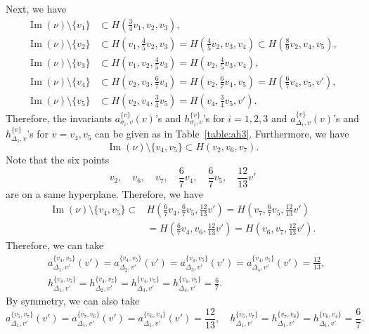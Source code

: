 Next, we have 
\begin{align*}
\operatorname{Im}(\nu) \setminus \{ v_1 \} &\subset H \left( \frac{3}{4} v_1, v_2, v_3 \right), \\
\operatorname{Im}(\nu) \setminus \{ v_2 \} &\subset H \left( v_1, \frac{4}{5} v_2, v_3 \right) = H \left( \frac{4}{5} v_2, v_3, v_4 \right) \subset H \left( \frac{8}{9} v_2, v_4, v_5 \right), \\
\operatorname{Im}(\nu) \setminus \{ v_3 \} &\subset H \left( v_1, v_2, \frac{4}{5} v_3 \right) = H \left( v_2, \frac{4}{5} v_3, v_4 \right), \\
\operatorname{Im}(\nu) \setminus \{ v_4 \} &\subset H \left( v_2, v_3, \frac{6}{7}v_4 \right) = H \left( v_2, \frac{6}{7}v_4, v_5 \right) = H \left(\frac{6}{7}v_4, v_5 ,v' \right), \\
\operatorname{Im}(\nu) \setminus \{ v_5 \} &\subset H \left( v_2, v_4, \frac{3}{4} v_5 \right) = H \left(v_4, \frac{3}{4} v_5, v' \right).
\end{align*}
Therefore, 
the invariants $a^{\{ v \}}_{\sigma _i, v}(v)$'s and $h^{\{ v \}}_{\sigma _i, v}$'s for $i=1,2,3$ 
and $a^{\{ v \}}_{\Delta _1, v}(v)$'s and $h^{\{ v \}}_{\Delta _1, v}$'s for $v = v_4, v_5$ can be given as in Table~\ref{table:ah3}. 
Furthermore, we have
\[
\operatorname{Im}(\nu) \setminus \{ v_4, v_5 \} \subset H(v_2, v_6, v_7). 
\]
Note that the six points
\[
v_2, \quad v_6, \quad v_7, \quad \frac{6}{7}v_4, \quad \frac{6}{7}v_5, \quad \frac{12}{13}v'
\]
are on a same hyperplane. 
Therefore, we have 
\begin{align*}
\operatorname{Im}(\nu) \setminus \{ v_4, v_5 \} 
\subset & H \left( \frac{6}{7}v_4, \frac{6}{7}v_5, \frac{12}{13}v' \right)
= H \left( v_7, \frac{6}{7}v_5, \frac{12}{13}v' \right) \\
&= H \left( \frac{6}{7}v_4, v_6, \frac{12}{13}v' \right)
= H \left( v_6, v_7, \frac{12}{13}v' \right). 
\end{align*}
Therefore, we can take 
\begin{align*}
&a^{\{ v_4, v_5 \}}_{\Delta _1, v'}(v') = a^{\{ v_4, v_5 \}}_{\Delta _2, v'}(v') = a^{\{ v_4, v_5 \}}_{\Delta _3, v'}(v') = a^{\{ v_4, v_5 \}}_{\Delta _4, v'}(v') = \frac{12}{13}, \\
&h^{\{ v_4, v_5 \}}_{\Delta _1, v'} = h^{\{ v_4, v_5 \}}_{\Delta _2, v'} = h^{\{ v_4, v_5 \}}_{\Delta _3, v'} = h^{\{ v_4, v_5 \}}_{\Delta _4, v'} = \frac{6}{7}. 
\end{align*}
By symmetry, we can also take
\[
a^{\{ v_5, v_7 \}}_{\Delta _1, v'}(v')
=a^{\{ v_7, v_6 \}}_{\Delta _1, v'}(v')
=a^{\{ v_6, v_4 \}}_{\Delta _1, v'}(v') = \frac{12}{13}, \quad
h^{\{ v_5, v_7 \}}_{\Delta _1, v'}
=h^{\{ v_7, v_6 \}}_{\Delta _1, v'}
=h^{\{ v_6, v_4 \}}_{\Delta _1, v'} = \frac{6}{7}.
\]

